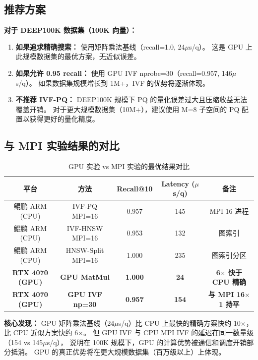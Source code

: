\documentclass[UTF8,a4paper,10pt]{ctexart}
\begin{document}
\subsection{推荐方案}

\textbf{对于 DEEP100K 数据集（100K 向量）：}
\begin{enumerate}[itemsep=0pt]
\item \textbf{如果追求精确搜索：} 使用矩阵乘法基线（recall=1.0, 24$\mu$s/q）。
这是 GPU 上此规模数据集的最优方案，无近似误差。

\item \textbf{如果允许 0.95 recall：} 使用 GPU IVF nprobe=30（recall=0.957, 146$\mu$s/q）。
如果数据集规模增长到 1M+，IVF 的优势将逐渐体现。

\item \textbf{不推荐 IVF-PQ：} DEEP100K 规模下 PQ 的量化误差过大且压缩收益无法覆盖开销。
对于更大规模数据集（10M+），建议使用 M=8 子空间的 PQ 配置以获得更好的量化精度。
\end{enumerate}

\subsection{与 MPI 实验结果的对比}

\begin{table}[H]
\centering
\caption{GPU 实验 vs MPI 实验的最优结果对比}
\label{tab:gpu-vs-mpi}
\begin{tabular}{ccccc}
\toprule
平台 & 方法 & Recall@10 & Latency ($\mu$s/q) & 备注 \\
\midrule
鲲鹏 ARM (CPU) & IVF-PQ MPI=16 & 0.957 & 145 & MPI 16 进程 \\
鲲鹏 ARM (CPU) & IVF-HNSW MPI=16 & 0.953 & 132 & 图索引 \\
鲲鹏 ARM (CPU) & HNSW-Split MPI=16 & 1.000 & 235 & 图索引分区 \\
\midrule
\textbf{RTX 4070 (GPU)} & \textbf{GPU MatMul} & \textbf{1.000} & \textbf{24} & \textbf{6$\times$ 快于 CPU 精确} \\
\textbf{RTX 4070 (GPU)} & \textbf{GPU IVF np=30} & \textbf{0.957} & \textbf{154} & \textbf{与 MPI 16$\times$1 持平} \\
\bottomrule
\end{tabular}
\end{table}

\noindent\textbf{核心发现：}
GPU 矩阵乘法基线（24$\mu$s/q）比 CPU 上最快的精确方案快约 10$\times$，
比 CPU 近似方案快约 6$\times$。
但 GPU IVF 与 CPU MPI IVF 的延迟在同一数量级（154 vs 145$\mu$s/q），
说明在 100K 规模下，GPU 的计算优势被通信和调度开销部分抵消。
GPU 的真正优势将在更大规模数据集（百万级以上）上体现。
\end{document}

